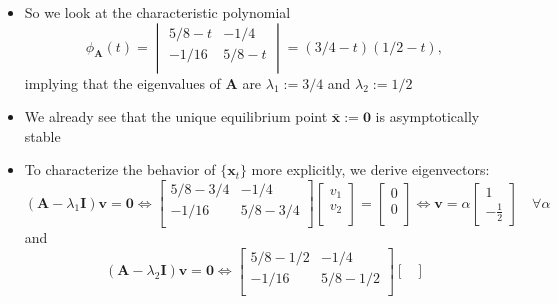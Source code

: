 \documentclass[12pt,a4paper]{article}
\begin{document}
\begin{itemize}
\begin{itemize}
  \item So we look at the characteristic polynomial
    \begin{equation}\nonumber%
      \phi_{\bm{A}}(t) = 
      \begin{vmatrix}
        5/8 - t & -1/4 \\
        -1/16 & 5/8 - t \\
      \end{vmatrix}
      = (3/4-t)(1/2-t),
    \end{equation}
    implying that
    the eigenvalues of $\bm{A}$ are $\lambda_{1}:=3/4$ and $\lambda_{2}:=1/2$
  \item We already see that
    the unique equilibrium point
    $\bar{\bm{x}}:=\bm{0}$ is asymptotically stable
  \item To characterize the behavior of $\{\bm{x}_{t}\}$ more explicitly,
    we derive eigenvectors:
    \begin{equation}\nonumber%
      (\bm{A}-\lambda_{1}\bm{I})\bm{v}
      = \bm{0}
      \iff
      \begin{bmatrix}
        5/8 - 3/4 & - 1/4 \\
        -1/16 & 5/8 - 3/4 \\
      \end{bmatrix}
      \begin{bmatrix}
        v_{1} \\
        v_{2} \\
      \end{bmatrix}
      =
      \begin{bmatrix}
        0 \\
        0 \\
      \end{bmatrix}
      \iff
      \bm{v} = \alpha
      \begin{bmatrix}
        1 \\
        -\frac{1}{2}
      \end{bmatrix}
      \quad \forall \alpha
    \end{equation}
    and
    \begin{equation}\nonumber%
      (\bm{A}-\lambda_{2}\bm{I})\bm{v}
      = \bm{0}
      \iff
      \begin{bmatrix}
        5/8 - 1/2 & - 1/4 \\
        -1/16 & 5/8 - 1/2 \\
      \end{bmatrix}
      \begin{bmatrix}

\end{bmatrix}
\end{equation}
\end{itemize}
\end{itemize}
\end{document}
